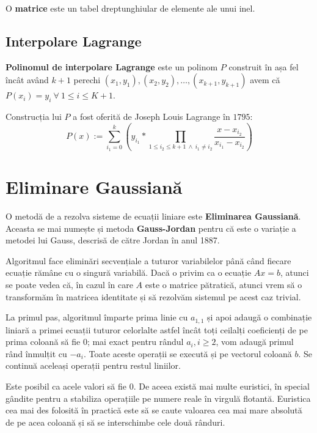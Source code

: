\begin{defn}
  O \textbf{matrice} este un tabel dreptunghiular de elemente ale unui inel.
\end{defn}

\subsection{Interpolare Lagrange}

\textbf{Polinomul de interpolare Lagrange} este un polinom $P$ construit în așa
fel încât având $k + 1$ perechi
$(x_{1}, y_{1}), (x_{2}, y_{2}), \ldots, (x_{k+1}, y_{k+1})$ avem că
$P(x_{i}) = y_{i}\ \forall\ 1 \leq i \leq K + 1$. \par
Construcția lui $P$ a fost oferită de Joseph Louis Lagrange în $1795$:
\begin{equation}
  P(x) := \displaystyle\sum\limits_{i_{1}=0}^{k} (y_{i_{1}} * \prod_{1 \leq i_{2} \leq k + 1 \ \land \ i_{1} \neq i_{2}} \frac{x - x_{i_{2}}}{x_{i_{1}} - x_{i_{2}}})
\end{equation}

\section{Eliminare Gaussiană}
\label{gauss}

O metodă de a rezolva sisteme de ecuații liniare este \textbf{Eliminarea Gaussiană}.
Aceasta se mai numește și metoda \textbf{Gauss-Jordan} pentru că este o variație a
metodei lui Gauss, descrisă de către Jordan în anul 1887.

Algoritmul face eliminări secvențiale a tuturor variabilelor până când fiecare ecuație
rămâne cu o singură variabilă. Dacă o privim ca o ecuație $Ax = b$, atunci se poate
vedea că, în cazul în care $A$ este o matrice pătratică, atunci vrem să o transformăm
în matricea identitate și să rezolvăm sistemul pe acest caz trivial.

La primul pas, algoritmul împarte prima linie cu $a_{1, 1}$ și apoi adaugă o combinație
liniară a primei ecuații tuturor celorlalte astfel încât toți ceilalți coeficienți de pe
prima coloană să fie $0$; mai exact pentru rândul $a_{i}, i \geq 2$, vom adaugă primul rând
înmulțit cu $-a_{i}$. Toate aceste operații se execută și pe vectorul coloană $b$. Se
continuă aceleași operații pentru restul liniilor.

Este posibil ca acele valori să fie $0$. De aceea există mai multe euristici, în special gândite
pentru a stabiliza operațiile pe numere reale în virgulă flotantă. Euristica cea mai des folosită
în practică este să se caute valoarea cea mai mare absolută de pe acea coloană și să se interschimbe
cele două rânduri.

